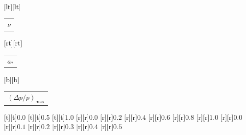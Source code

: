 %    
%
%
\begin{psfrags}%
\psfragscanon%
%
[lt][lt]{\color[rgb]{0,0,0}\setlength{\tabcolsep}{0pt}\begin{tabular}{l}{\Large$\nu$}\end{tabular}}%
[rt][rt]{\color[rgb]{0,0,0}\setlength{\tabcolsep}{0pt}\begin{tabular}{r}{\Large$a_\ast$}\end{tabular}}%
[b][b]{\color[rgb]{0,0,0}\setlength{\tabcolsep}{0pt}\begin{tabular}{c}{\Large$(\Delta p/p)_{\mathrm{max}}$}\end{tabular}}%
%
[t][t]{$0.0$}%
[t][t]{$0.5$}%
[t][t]{$1.0$}%
%
[r][r]{$0.0$}%
[r][r]{$0.2$}%
[r][r]{$0.4$}%
[r][r]{$0.6$}%
[r][r]{$0.8$}%
[r][r]{$1.0$}%
%
[r][r]{$0.0$}%
[r][r]{$0.1$}%
[r][r]{$0.2$}%
[r][r]{$0.3$}%
[r][r]{$0.4$}%
[r][r]{$0.5$}%
%
%
\end{psfrags}%
%
